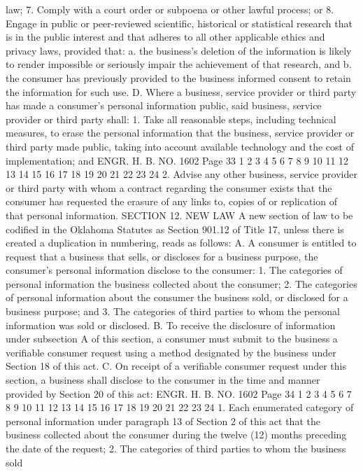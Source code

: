 law;
7. Comply with a court order or subpoena or other lawful
process; or
8. Engage in public or peer-reviewed scientific, historical or
statistical research that is in the public interest and that adheres
to all other applicable ethics and privacy laws, provided that:
a. the business's deletion of the information is likely
to render impossible or seriously impair the
achievement of that research, and
b. the consumer has previously provided to the business
informed consent to retain the information for such
use.
D. Where a business, service provider or third party has made a
consumer's personal information public, said business, service
provider or third party shall:
1. Take all reasonable steps, including technical measures, to
erase the personal information that the business, service provider
or third party made public, taking into account available technology
and the cost of implementation; and
ENGR. H. B. NO. 1602 Page 33
1
2
3
4
5
6
7
8
9
10
11
12
13
14
15
16
17
18
19
20
21
22
23
24
2. Advise any other business, service provider or third party
with whom a contract regarding the consumer exists that the consumer
has requested the erasure of any links to, copies of or replication
of that personal information.
SECTION 12. NEW LAW A new section of law to be codified
in the Oklahoma Statutes as Section 901.12 of Title 17, unless there
is created a duplication in numbering, reads as follows:
A. A consumer is entitled to request that a business that
sells, or discloses for a business purpose, the consumer's personal
information disclose to the consumer:
1. The categories of personal information the business
collected about the consumer;
2. The categories of personal information about the consumer
the business sold, or disclosed for a business purpose; and
3. The categories of third parties to whom the personal
information was sold or disclosed.
B. To receive the disclosure of information under subsection A
of this section, a consumer must submit to the business a verifiable
consumer request using a method designated by the business under
Section 18 of this act.
C. On receipt of a verifiable consumer request under this
section, a business shall disclose to the consumer in the time and
manner provided by Section 20 of this act:
ENGR. H. B. NO. 1602 Page 34
1
2
3
4
5
6
7
8
9
10
11
12
13
14
15
16
17
18
19
20
21
22
23
24
1. Each enumerated category of personal information under
paragraph 13 of Section 2 of this act that the business collected
about the consumer during the twelve (12) months preceding the date
of the request;
2. The categories of third parties to whom the business sold
